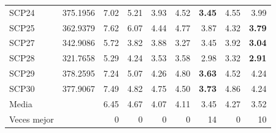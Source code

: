 \begin{table}[H]
\begin{tabular}{@{}lrrrrrrrr@{}}
SCP24 & 375.1956 & 7.02 & 5.21 & 3.93 & 4.52 & \textbf{3.45} & 4.55 & 3.99 \\
SCP25 & 362.9379 & 7.62 & 6.07 & 4.44 & 4.77 & 3.87 & 4.32 & \textbf{3.79} \\
SCP27 & 342.9086 & 5.72 & 3.82 & 3.88 & 3.27 & 3.45 & 3.92 & \textbf{3.04} \\
SCP28 & 321.7658 & 5.29 & 4.24 & 3.53 & 3.58 & 2.98 & 3.32 & \textbf{2.91} \\
SCP29 & 378.2595 & 7.24 & 5.07 & 4.26 & 4.80 & \textbf{3.63} & 4.52 & 4.24 \\
SCP30 & 377.9067 & 7.49 & 4.82 & 4.75 & 4.50 & \textbf{3.73} & 4.86 & 4.24 \\
\midrule
Media & & 6.45 & 4.67 & 4.07 & 4.11 & 3.45 & 4.27 & 3.52 \\
Veces mejor & & 0 & 0 & 0 & 0 & 14 & 0 & 10 \\
\bottomrule
\end{tabular}
\end{table}
